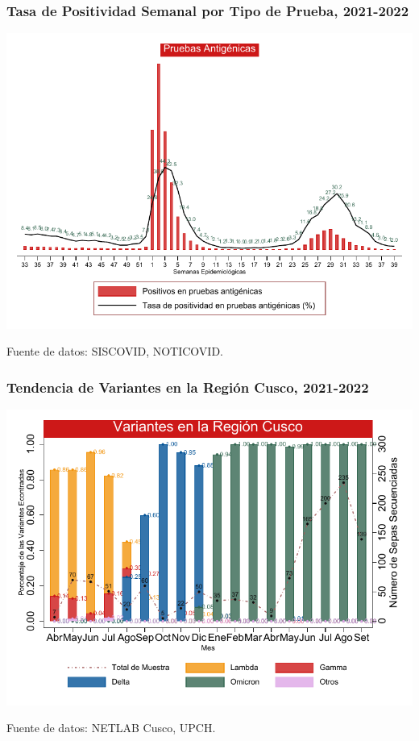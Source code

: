 \documentclass[xcolor=table]{beamer}
\begin{document}
	\begin{frame}
		\frametitle{Tasa de Positividad Semanal por Tipo de Prueba, 2021-2022}
		\vspace{-.5cm}
		\begin{center}
			\includegraphics[width=0.8\linewidth]{../figuras/positividad_ag.pdf}
		\end{center}
		{\tiny Fuente de datos: SISCOVID, NOTICOVID.}
	\end{frame}

	\begin{frame}[label=variantes]
		\frametitle{Tendencia de Variantes en la Región Cusco, 2021-2022}
		\vspace{-.5cm}
		\begin{center}
			\includegraphics[width=0.9\linewidth]{../figuras/variantes.pdf}
		\end{center}
		{\tiny Fuente de datos: NETLAB Cusco, UPCH.}
	\end{frame}
\end{document}
